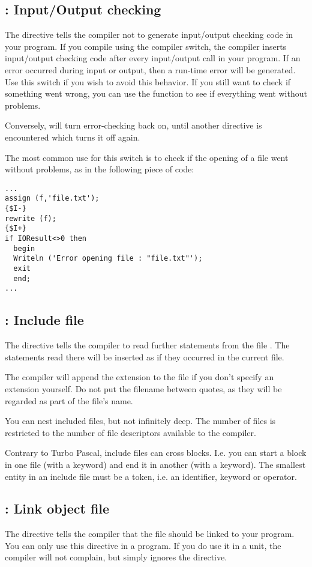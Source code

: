 \documentclass{report}
\begin{document}
\subsection{ : Input/Output checking}
The  directive tells the compiler not to generate input/output
checking code in your program. If you compile using the  compiler
switch, the \fpc compiler inserts input/output
checking code after every input/output call in your program. If an error
occurred during input or output, then a run-time error will be generated.
Use this switch if you wish to avoid this behavior.
If you still want to check if something went wrong, you can use the
 function to see if everything went without problems.

Conversely,  will turn error-checking back on, until another
directive is encountered which turns it off again.

The most common use for this switch is to check if the opening of a file
went without problems, as in the following piece of code:
\begin{verbatim}
...
assign (f,'file.txt');
{$I-}
rewrite (f);
{$I+}
if IOResult<>0 then
  begin
  Writeln ('Error opening file : "file.txt"');
  exit
  end;
...
\end{verbatim}

\subsection{ : Include file }
The  directive tells the compiler to read further
statements from the file . The statements read there will be
inserted as if they occurred in the current file.

The compiler will append the  extension to the file if you don't
specify an extension yourself. Do not put the filename between quotes, as
they will be regarded as part of the file's name.

You can nest included files, but not infinitely deep. The number of files is
restricted to the number of file descriptors available to the \fpc compiler.

Contrary to Turbo Pascal, include files can cross blocks. I.e. you can start
a block in one file (with a  keyword) and end it in another (with
a  keyword). The smallest entity in an include file must be a token,
i.e. an identifier, keyword or operator.

\subsection{ : Link object file}
The  directive tells the compiler that the file 
should be linked to your program. You can only use this directive in a
program. If you do use it in a unit, the compiler will not complain, but
simply ignores the directive.
\end{document}
